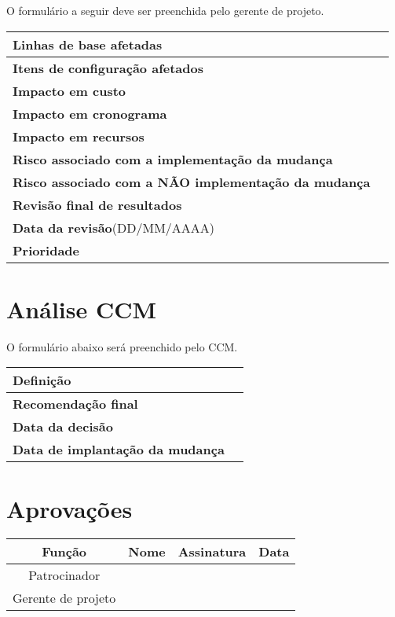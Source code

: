 O formulário a seguir deve ser preenchida pelo gerente de projeto.

\begin{table}[H]
	\begin{tabularx}{\textwidth}{| p{} | X |}
		\hline
		\textbf{Linhas de base afetadas} & \\
		\hline
		\textbf{Itens de configuração afetados} & \\
		\hline
        \textbf{Impacto em custo} & \\
		\hline
        \textbf{Impacto em cronograma} & \\
		\hline
        \textbf{Impacto em recursos} & \\
		\hline
        \textbf{Risco associado com a implementação da mudança} & \\
		\hline
        \textbf{Risco associado com a NÃO implementação da mudança} & \\
		\hline
        \textbf{Revisão final de resultados} & \\
		\hline
        \textbf{Data da revisão}(DD/MM/AAAA) & \\
		\hline
        \textbf{Prioridade} & \\
		\hline
	\end{tabularx}
	\centering
\end{table}

\section{Análise CCM}

O formulário abaixo será preenchido pelo CCM.

\begin{table}[H]
	\begin{tabularx}{\textwidth}{| p{} | X |}
		\hline
		\textbf{Definição} & \\
		\hline
		\textbf{Recomendação final} & \\
		\hline
        \textbf{Data da decisão} & \\
		\hline
        \textbf{Data de implantação da mudança} & \\
		\hline
	\end{tabularx}
	\centering
\end{table}

\section{Aprovações}

\begin{table}[H]
	\begin{tabularx}{\textwidth}{| c | c | X | c |}
		\hline
		\textbf{Função}  & \textbf{Nome}       & \textbf{Assinatura}      & \textbf{Data} \\
		\hline
		Patrocinador       & \projectSponsorName & \projectSponsorSignature &               \\
		\hline
		Gerente de projeto & \projectManagerName & \projectManagerSignature &               \\
		\hline
	\end{tabularx}
	\centering
\end{table}